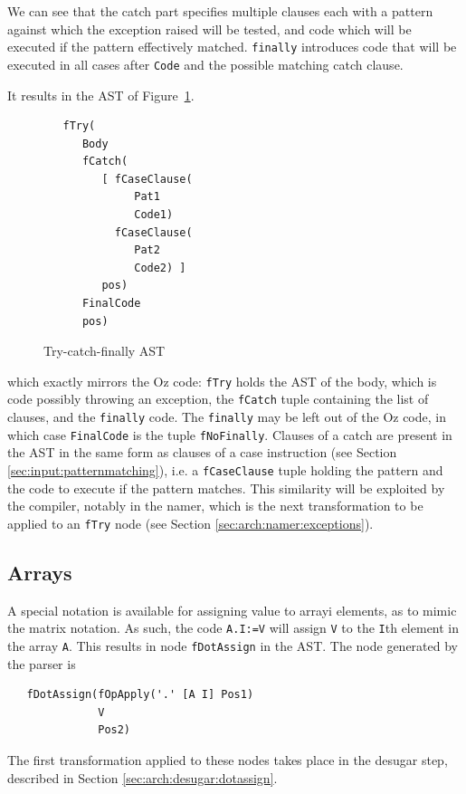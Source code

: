 \documentclass[a4paper]{memoir}
\begin{document}
We can see that the catch part specifies multiple clauses each with a pattern
against which the exception raised will be tested, and code which will be
executed if the pattern effectively matched. \lstinline!finally! introduces code
that will be executed in all cases after \lstinline!Code! and the possible
matching catch clause.

It results in the AST of Figure~\ref{fig:tryast}.
\begin{figure}[h]
\begin{lstlisting}
   fTry(
      Body
      fCatch(
         [ fCaseClause(
              Pat1
              Code1)
           fCaseClause(
              Pat2
              Code2) ]
         pos)
      FinalCode
      pos)
\end{lstlisting}
\caption{Try-catch-finally AST}
\label{fig:tryast}
\end{figure}


which exactly mirrors the Oz code: \lstinline!fTry! holds the AST of the body,
which is code possibly throwing an exception, the \lstinline!fCatch! tuple containing the list of
clauses, and the \lstinline!finally! code. The \lstinline!finally! may be left
out of the Oz code, in which case \lstinline!FinalCode! is the tuple
\lstinline!fNoFinally!.
Clauses of a catch are present in the AST in the same form as clauses of a case
instruction (see Section \ref{sec:input:patternmatching}), i.e. a
\lstinline!fCaseClause! tuple holding the pattern and the code to execute if
the pattern matches. This similarity will be exploited by the compiler, notably
in the namer, which is the next transformation to be applied to an
\lstinline!fTry! node (see Section \ref{sec:arch:namer:exceptions}).


\subsection{Arrays}
A special notation is available for assigning value to arrayi elements, as to mimic the
matrix notation. As such, the code \lstinline!A.I:=V! will assign \lstinline!V!
to the \lstinline!I!th element in the array \lstinline!A!.
This results in node \lstinline!fDotAssign! in the AST. The node generated by
the parser is
\begin{lstlisting}
   fDotAssign(fOpApply('.' [A I] Pos1) 
              V 
              Pos2) 
\end{lstlisting}
The first transformation applied to these nodes takes place in the desugar step,
described in Section \ref{sec:arch:desugar:dotassign}.
\end{document}
